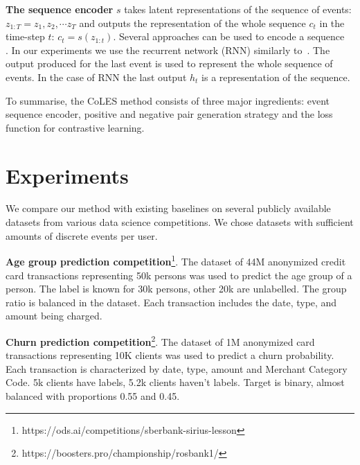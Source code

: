 \documentclass[sigconf]{acmart}
\begin{document}
\textbf{The sequence encoder} $s$ takes latent representations of the sequence of events: $ z_{1:T} = z_1, z_2, \cdots z_T $ and outputs the representation of the whole sequence $c_t$ in the time-step $t$: $ c_t = s(z_{1:t}) $.
Several approaches can be used to encode a sequence~\citep{Cho2014LearningPR, Vaswani2017AttentionIA} . In our experiments we use the recurrent network (RNN) similarly to~\citep{Sutskever2014SequenceTS}. The output produced for the last event is used to represent the whole sequence of events. In the case of RNN the last output $h_t$ is a representation of the sequence.

To summarise, the CoLES method consists of three major ingredients: event sequence encoder, positive and negative pair generation strategy and the loss function for contrastive learning.


\section{Experiments} \label{sec-exp}

We compare our method with existing baselines on several publicly available datasets from various data science competitions. We chose datasets with sufficient amounts of discrete events per user.

\textbf{Age group prediction competition}\footnote{https://ods.ai/competitions/sberbank-sirius-lesson}. The dataset of 44M anonymized credit card transactions representing 50k persons was used to predict the age group of a person. The label is known for 30k persons, other 20k are unlabelled. The group ratio is balanced in the dataset. Each transaction includes the date, type, and amount being charged.


\textbf{Churn prediction competition}\footnote{https://boosters.pro/championship/rosbank1/}. The dataset of 1M anonymized card transactions representing 10K clients was used to predict a churn probability. Each transaction is characterized by date, type, amount and Merchant Category Code. 5k clients have labels, 5.2k clients haven't labels. Target is binary, almost balanced with proportions 0.55 and 0.45.
\end{document}
